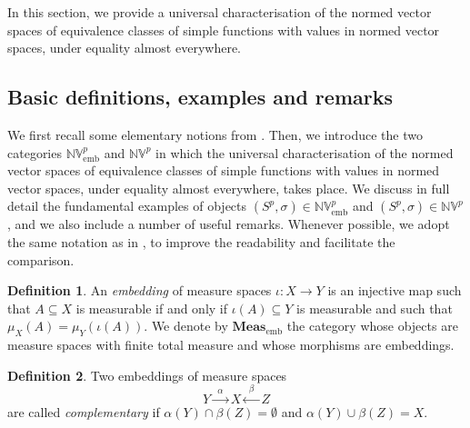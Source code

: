 \documentclass{amsart}
\theoremstyle{definition}
\newtheorem{definition}{Definition}[section]
\theoremstyle{plain}
\newcommand{\embMeas}{\mathbf{Meas}_\mathrm{emb}}
\newcommand{\NVembp}{\mathbb{NV}_{\mathrm{emb}}^p}
\newcommand{\NVp}{\mathbb{NV}^p}
\begin{document}
    In this section, we provide a universal characterisation of the normed vector spaces of equivalence classes of simple functions with values in normed vector spaces, under equality almost everywhere.


    \subsection{Basic definitions, examples and remarks}
    \label{sec:basic definitions examples and remarks 1}

        We first recall some elementary notions from \cite{Leinster2023}.
        Then, we introduce the two categories $\NVembp$ and $\NVp$ in which the universal characterisation of the normed vector spaces of equivalence classes of simple functions with values in normed vector spaces, under equality almost everywhere, takes place.
        We discuss in full detail the fundamental examples of objects $(S^p,\sigma) \in \NVembp$ and $(S^p,\sigma) \in \NVp$, and we also include a number of useful remarks.
        Whenever possible, we adopt the same notation as in \cite{Leinster2023}, to improve the readability and facilitate the comparison.

        \begin{definition}
        \label{def:embedding}
            An \emph{embedding} of measure spaces $\iota \colon X \rightarrow Y$ is an injective map such that $A \subseteq X$ is measurable if and only if $\iota(A) \subseteq Y$ is measurable and such that $\mu_X(A) = \mu_Y \left( \iota(A) \right)$.
            We denote by $\embMeas$ the category whose objects are measure spaces with finite total measure and whose morphisms are embeddings.
        \end{definition}

        \begin{definition}
        \label{def:complementary embeddings}
            Two embeddings of measure spaces
            \begin{equation*}
                Y \xrightarrow{~~\alpha~~} X \xleftarrow{~~\beta~~} Z
            \end{equation*}
            are called \emph{complementary} if $\alpha(Y) \cap \beta(Z) = \emptyset$ and $\alpha(Y) \cup \beta(Z) = X$.
        \end{definition}
\end{document}
